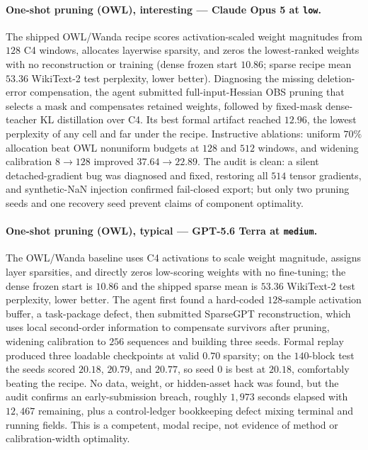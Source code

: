\paragraph{One-shot pruning (OWL), interesting --- Claude Opus 5 at \texttt{low}.} The shipped OWL/Wanda recipe scores activation-scaled weight magnitudes from $128$ C4 windows, allocates layerwise sparsity, and zeros the lowest-ranked weights with no reconstruction or training (dense frozen start $10.86$; sparse recipe mean $53.36$ WikiText-2 test perplexity, lower better). Diagnosing the missing deletion-error compensation, the agent submitted full-input-Hessian OBS pruning that selects a mask and compensates retained weights, followed by fixed-mask dense-teacher KL distillation over C4. Its best formal artifact reached $12.96$, the lowest perplexity of any cell and far under the recipe. Instructive ablations: uniform $70\%$ allocation beat OWL nonuniform budgets at $128$ and $512$ windows, and widening calibration $8\rightarrow128$ improved $37.64\rightarrow22.89$. The audit is clean: a silent detached-gradient bug was diagnosed and fixed, restoring all $514$ tensor gradients, and synthetic-NaN injection confirmed fail-closed export; but only two pruning seeds and one recovery seed prevent claims of component optimality.

\paragraph{One-shot pruning (OWL), typical --- GPT-5.6 Terra at \texttt{medium}.} The OWL/Wanda baseline uses C4 activations to scale weight magnitude, assigns layer sparsities, and directly zeros low-scoring weights with no fine-tuning; the dense frozen start is $10.86$ and the shipped sparse mean is $53.36$ WikiText-2 test perplexity, lower better. The agent first found a hard-coded $128$-sample activation buffer, a task-package defect, then submitted SparseGPT reconstruction, which uses local second-order information to compensate survivors after pruning, widening calibration to $256$ sequences and building three seeds. Formal replay produced three loadable checkpoints at valid $0.70$ sparsity; on the $140$-block test the seeds scored $20.18$, $20.79$, and $20.77$, so seed $0$ is best at $20.18$, comfortably beating the recipe. No data, weight, or hidden-asset hack was found, but the audit confirms an early-submission breach, roughly $1{,}973$ seconds elapsed with $12{,}467$ remaining, plus a control-ledger bookkeeping defect mixing terminal and running fields. This is a competent, modal recipe, not evidence of method or calibration-width optimality.

